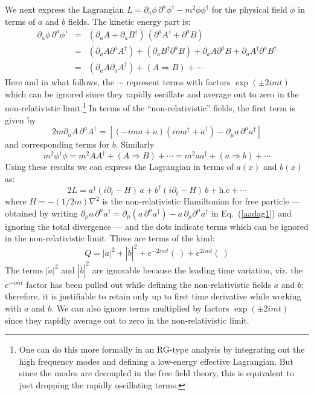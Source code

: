 \documentclass[12pt]{article}
\def\eq#1{{Eq.~(\ref{#1})}}
\begin{document}
 We next express the  Lagrangian $L=\partial_a \phi \, \partial^a \phi^\dagger-m^2\phi\phi^\dagger$ for the physical field $\phi$ in terms of $a$ and $b$ fields. The kinetic energy part is:
\begin{eqnarray}
 \partial_a \phi \, \partial^a \phi^\dagger &=& \left(\partial_a A+\partial_a  B^\dagger \right) \, \left(\partial^a A^\dagger + \partial^a B\right) \\
 &=& \left(\partial_a A \partial^a A^\dagger\right) +  \left(\partial_a B^\dagger \partial^a  B\right) + \partial_a A\partial^a B + \partial_a A^\dagger \partial^a  B^\dagger\nonumber\\ 
 &=& \left(\partial_a A \partial_a A^\dagger\right) +  \left( A\Rightarrow B \right) + \cdots
\end{eqnarray} 
Here and in what follows, the $\cdots$ represent terms with factors $\exp(\pm 2imt)$ which can be ignored
since they rapidly oscillate and average out to zero in the non-relativistic limit.\footnote{One can do this more formally in an RG-type analysis by integrating out the high frequency modes and defining a low-energy effective Lagrangian. But since the modes are decoupled in the free field theory, this is equivalent to just dropping the rapidly oscillating terms.}
In terms of the ``non-relativistic'' fields, the first term is given by
\begin{equation}
 2m \partial_a A \, \partial^a A^\dagger= \left[ \left( - i m a + \dot a\right) \left( i m a^\dagger + \dot a^\dagger\right) - \partial_\mu a\, \partial^\mu a^\dagger\right]
 \label{aadag1}
\end{equation} 
and corresponding terms for $b$.
Similarly
\begin{equation}
 m^2 \phi^\dagger \phi  = m^2 AA^\dagger +  \left( A\Rightarrow B \right) + \cdots
 = m^2 aa^\dagger +  \left( a\Rightarrow b \right) + \cdots
\end{equation} 
Using these results we can express the  Lagrangian in terms of $a(x)$ and $b(x)$ as:
\begin{equation}
 2 L = a^\dagger \left( i \partial_t - H\right)\, a + b^\dagger \left( i \partial_t - H\right) \, b + \text{h.c} + \cdots
 \label{onetwoeight}
\end{equation} 
where $H=-(1/2m)\nabla^2$ is the non-relativistic Hamiltonian for free particle --- obtained by writing $\partial_\mu a\, \partial^\mu a^\dagger=
\partial_\mu (a\, \partial^\mu a^\dagger)-a\,\partial_\mu\partial^\mu a^\dagger$ in \eq{aadag1} and ignoring the total divergence ---
and
the dots indicate terms which can be ignored   in the non-relativistic  limit. These are terms of the kind:
\begin{equation}
 Q = |\dot a|^2  + |\dot b|^2 + e^{-2imt} (\ ) +  e^{2imt} (\ )
\end{equation} 
 The terms $|\dot a|^2$ and $|\dot b|^2$ are ignorable because the leading time variation, viz. the $e^{-imt}$ factor has been pulled out  while defining the non-relativistic fields $a$ and $b$; therefore, it is justifiable to retain only up to first time derivative while working with $a$ and $b$. We can also ignore terms multiplied by factors $\exp(\pm 2imt)$ since they rapidly average out to zero in the non-relativistic limit.
  
\end{document}
